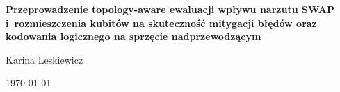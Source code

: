 \documentclass[11pt]{article}
\begin{document}
\begin{titlepage}
\centering
\vspace*{3cm}

{\LARGE\bfseries Przeprowadzenie topology-aware ewaluacji wpływu narzutu SWAP
i~rozmieszczenia kubitów na skuteczność mitygacji błędów oraz kodowania logicznego
na sprzęcie nadprzewodzącym\par}


\vspace{3cm}
{\Large Karina Leskiewicz\par}



\vfill
{\large \today\par}
\end{titlepage}

\tableofcontents
\newpage
\end{document}
